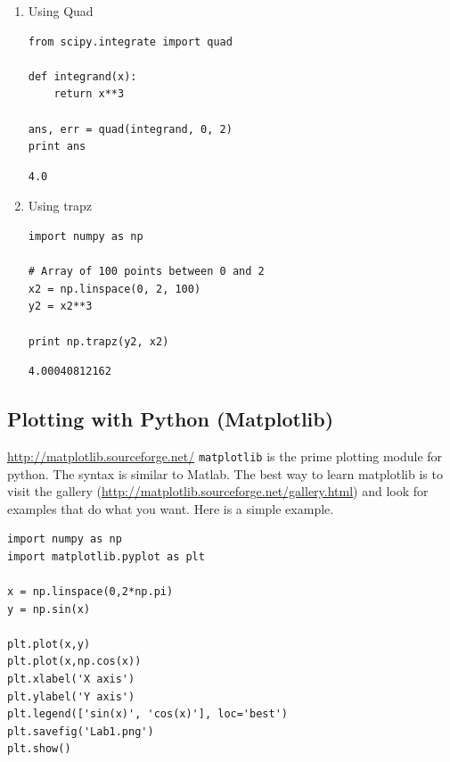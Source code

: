 \documentclass[11pt]{article}
\begin{document}
\begin{enumerate}
\item Using Quad
\label{sec-3-12-2-1}
\begin{verbatim}
from scipy.integrate import quad

def integrand(x):
    return x**3

ans, err = quad(integrand, 0, 2)
print ans
\end{verbatim}

\begin{verbatim}
4.0
\end{verbatim}


\item Using trapz
\label{sec-3-12-2-2}

\begin{verbatim}
import numpy as np

# Array of 100 points between 0 and 2
x2 = np.linspace(0, 2, 100)
y2 = x2**3

print np.trapz(y2, x2)
\end{verbatim}

\begin{verbatim}
4.00040812162
\end{verbatim}
\end{enumerate}


\subsection{Plotting with Python (Matplotlib)}
\label{sec-3-13}
\url{http://matplotlib.sourceforge.net/}
\texttt{matplotlib} is the prime plotting module for python. The syntax is similar to Matlab. The best way to learn matplotlib is to visit the gallery (\url{http://matplotlib.sourceforge.net/gallery.html}) and look for examples that do what you want. Here is a simple example.

\begin{verbatim}
import numpy as np
import matplotlib.pyplot as plt

x = np.linspace(0,2*np.pi)
y = np.sin(x)

plt.plot(x,y)
plt.plot(x,np.cos(x))
plt.xlabel('X axis')
plt.ylabel('Y axis')
plt.legend(['sin(x)', 'cos(x)'], loc='best')
plt.savefig('Lab1.png')
plt.show()
\end{verbatim}
\end{document}
